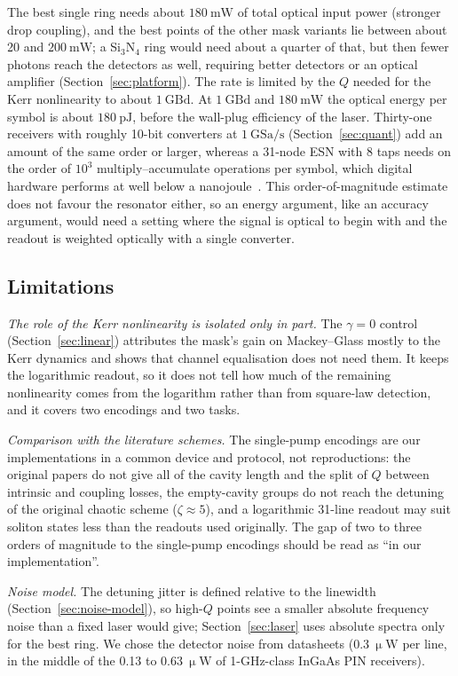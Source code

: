The best single ring needs about $180~\mathrm{mW}$ of total optical input power (stronger drop coupling), and the best points of the
other mask variants lie between about 20 and $200~\mathrm{mW}$; a Si$_3$N$_4$ ring would need about a quarter of that, but then fewer
photons reach the detectors as well, requiring better detectors or an optical amplifier (Section~\ref{sec:platform}). The rate is
limited by the $Q$ needed for the Kerr nonlinearity to about $1~\mathrm{GBd}$. At $1~\mathrm{GBd}$ and $180~\mathrm{mW}$ the optical
energy per symbol is about $180~\mathrm{pJ}$, before the wall-plug efficiency of the laser. Thirty-one receivers with roughly 10-bit
converters at $1~\mathrm{GSa/s}$ (Section~\ref{sec:quant}) add an amount of the same order or larger, whereas a 31-node ESN with 8 taps
needs on the order of $10^{3}$ multiply--accumulate operations per symbol, which digital hardware performs at well below a nanojoule~\cite{horowitz2014}.
This order-of-magnitude estimate does not favour the resonator either, so an energy argument, like an accuracy argument, would need a
setting where the signal is optical to begin with and the readout is weighted optically with a single converter.

\subsection{Limitations}

\emph{The role of the Kerr nonlinearity is isolated only in part.} The $\gamma=0$ control (Section~\ref{sec:linear}) attributes
the mask's gain on Mackey--Glass mostly to the Kerr dynamics and shows that channel equalisation does not need them. It keeps the
logarithmic readout, so it does not tell how much of the remaining nonlinearity comes from the logarithm rather than from square-law
detection, and it covers two encodings and two tasks.

\emph{Comparison with the literature schemes.} The single-pump encodings are our implementations in a common device and protocol, not
reproductions: the original papers do not give all of the cavity length and the split of $Q$ between intrinsic and coupling losses,
the empty-cavity
groups do not reach the detuning of the original chaotic scheme ($\zeta\approx5$), and a logarithmic 31-line readout may suit soliton
states less than the readouts used originally. The gap of two to three orders of magnitude to the single-pump encodings should be read as ``in our implementation''.

\emph{Noise model.} The detuning jitter is defined relative to the linewidth (Section~\ref{sec:noise-model}), so high-$Q$ points see a
smaller absolute frequency noise than a fixed laser would give; Section~\ref{sec:laser} uses absolute spectra only for the best ring.
We chose the detector noise from datasheets ($0.3~\upmu\mathrm{W}$ per line, in the middle of the 0.13 to $0.63~\upmu\mathrm{W}$ of
1-GHz-class InGaAs PIN receivers).

